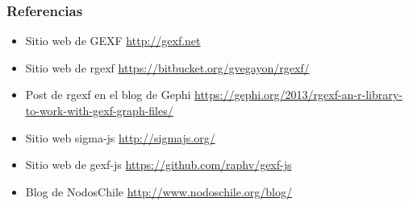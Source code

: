 \documentclass{beamer}\usepackage{graphicx, color}
\begin{document}
\begin{frame}
\frametitle{Referencias}
\begin{itemize}
\item Sitio web de GEXF \url{http://gexf.net}
\item Sitio web de rgexf \url{https://bitbucket.org/gvegayon/rgexf/}
\item Post de rgexf en el blog de Gephi \url{https://gephi.org/2013/rgexf-an-r-library-to-work-with-gexf-graph-files/}
\item Sitio web sigma-js \url{http://sigmajs.org/}
\item Sitio web de gexf-js \url{https://github.com/raphv/gexf-js}
\item Blog de NodosChile \url{http://www.nodoschile.org/blog/}
\end{itemize}
\end{frame}

\def\title{Gracias!}
\end{document}
